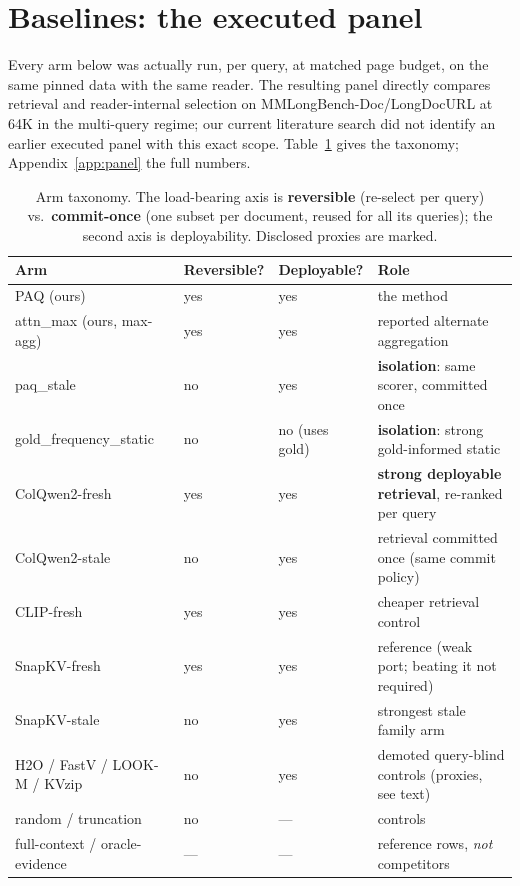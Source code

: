 \documentclass[11pt,letterpaper]{article}
\newcommand{\paq}{\textsc{PAQ}}
\begin{document}
\section{Baselines: the executed panel}\label{sec:baselines}

Every arm below was actually run, per query, at matched page budget, on the same pinned data with
the same reader. The resulting panel directly compares retrieval and reader-internal selection on
MMLongBench-Doc/LongDocURL at 64K in the multi-query regime; our current literature search did not
identify an earlier executed panel with this exact scope. Table~\ref{tab:taxonomy} gives the
taxonomy; Appendix~\ref{app:panel} the full numbers.

\begin{table}[t]
\centering\small
\caption{Arm taxonomy. The load-bearing axis is \textbf{reversible} (re-select per query) vs.\
\textbf{commit-once} (one subset per document, reused for all its queries); the second axis is
deployability. Disclosed proxies are marked.}
\label{tab:taxonomy}
\begin{tabular}{llll}
\toprule
Arm & Reversible? & Deployable? & Role \\
\midrule
\paq{} (ours) & yes & yes & the method \\
attn\_max (ours, max-agg) & yes & yes & reported alternate aggregation \\
paq\_stale & no & yes & \textbf{isolation}: same scorer, committed once \\
gold\_frequency\_static & no & no (uses gold) & \textbf{isolation}: strong gold-informed static \\
ColQwen2-fresh & yes & yes & \textbf{strong deployable retrieval}, re-ranked per query \\
ColQwen2-stale & no & yes & retrieval committed once (same commit policy) \\
CLIP-fresh & yes & yes & cheaper retrieval control \citep{radford2021clip} \\
SnapKV-fresh & yes & yes & reference (weak port; beating it not required) \\
SnapKV-stale & no & yes & strongest stale family arm \\
H2O / FastV / LOOK-M / KVzip & no & yes & demoted query-blind controls (proxies, see text) \\
random / truncation & no & --- & controls \\
full-context / oracle-evidence & --- & --- & reference rows, \emph{not} competitors \\
\bottomrule
\end{tabular}
\end{table}
\end{document}
